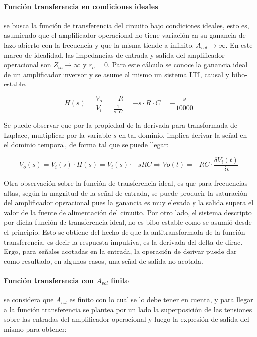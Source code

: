 \paragraph*{Funci\'on transferencia en condiciones ideales}se busca la funci\'on de transferencia del circuito bajo condiciones ideales, esto es, asumiendo que el amplificador operacional no tiene variaci\'on en su ganancia de lazo abierto con la frecuencia y que la misma tiende a infinito, $A_{vol} \to \infty$. En este marco de idealidad, las impedancias de entrada y salida del amplificador operacional son $Z_{in} \to \infty$ y $r_o = 0$. Para este c\'alculo se conoce la ganancia ideal de un amplificador inversor y se asume al mismo un sistema LTI, causal y bibo-estable.

\begin{equation}
	H(s) = \frac{V_o}{V_i} = \frac{-R}{ \frac{1}{s \cdot C}} = -s \cdot R  \cdot C
	= -\frac{s}{10000}
	\label{eq:derivador_transfer_ideal}
\end{equation}

Se puede observar que por la propiedad de la derivada para transformada de Laplace, multiplicar por la variable $s$ en tal dominio, implica derivar la se\~nal en el dominio temporal, de forma tal que se puede llegar:

\begin{equation*}
	V_o(s) = V_i(s) \cdot H(s) = V_i(s) \cdot -sRC \Rightarrow
	Vo(t) = -RC \cdot \frac{\delta V_i(t)}{\delta t}
\end{equation*}

Otra observaci\'on sobre la funci\'on de transferencia ideal, es que para frecuencias altas, 
seg\'un la magnitud de la se\~nal de entrada, se puede producir la saturaci\'on del amplificador
operacional pues la ganancia es muy elevada y la salida supera el valor de la fuente de 
alimentaci\'on del circuito. Por otro lado, el sistema descripto por dicha funci\'on de 
transferencia ideal, no es bibo-estable como se asumi\'o desde el principio. 
Esto se obtiene del hecho de que la antitransformada de la funci\'on transferencia, es decir la respuesta impulsiva, 
es la derivada del delta de dirac. Ergo, para se\~nales acotadas en la entrada, la operaci\'on de derivar
puede dar como resultado, en algunos casos, una se\~nal de salida no acotada.


\paragraph*{Funci\'on transferencia con $A_{vol}$ finito}se considera que $A_{vol}$ es finito con lo cual se lo debe tener en cuenta, y para llegar a la funci\'on transferencia se plantea por un lado la superposici\'on de las tensiones sobre las entradas del amplificador operacional y luego la expresi\'on de salida del mismo para obtener:

